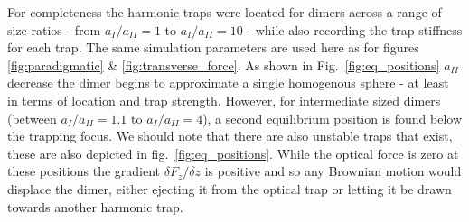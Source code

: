 \newpage
For completeness the harmonic traps were located for dimers
across a range of size ratios - from $a_{I}/a_{II} = 1$ to 
$a_{I}/a_{II}=10$ - while also recording the trap stiffness 
for each trap. The same simulation parameters are used here 
as for figures \ref{fig:paradigmatic} \& \ref{fig:transverse_force}. 
As shown in Fig.~\ref{fig:eq_positions} $a_{II}$ decrease 
the dimer begins to approximate a single homogenous sphere 
- at least in terms of location and trap strength. However, 
for intermediate sized dimers (between $a_{I}/a_{II} = 1.1$ 
to $a_{I}/a_{II}=4$), a second equilibrium position is found 
below the trapping focus. We should note that there are also
unstable traps that exist, these are also depicted in 
fig.~\ref{fig:eq_positions}. While the optical force
is zero at these positions the gradient $\delta F_z/\delta z$
is positive and so any Brownian motion would displace the 
dimer, either ejecting it from the optical trap or letting
it be drawn towards another harmonic trap. 
